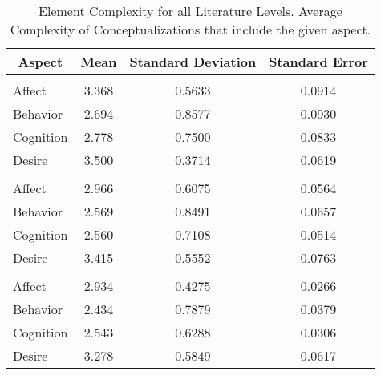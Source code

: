 \begin{table}
\begin{minipage}[t][\textheight][t]{\textwidth}

\caption{\label{tab:CombinedElementComplexity}Element Complexity for all Literature Levels. Average Complexity of Conceptualizations that include the given aspect.}
\begin{tabular}[t]{lccc}
\toprule
\multicolumn{1}{c}{Aspect} & Mean & Standard Deviation & Standard Error\\
\midrule
\addlinespace[0.3em]
\multicolumn{4}{l}{\textbf{Theoretical}}\\
\hspace{1em}Affect & 3.368 & 0.5633 & 0.0914\\
\hspace{1em}Behavior & 2.694 & 0.8577 & 0.0930\\
\hspace{1em}Cognition & 2.778 & 0.7500 & 0.0833\\
\hspace{1em}Desire & 3.500 & 0.3714 & 0.0619\\
\addlinespace[0.3em]
\multicolumn{4}{l}{\textbf{Methdological}}\\
\hspace{1em}Affect & 2.966 & 0.6075 & 0.0564\\
\hspace{1em}Behavior & 2.569 & 0.8491 & 0.0657\\
\hspace{1em}Cognition & 2.560 & 0.7108 & 0.0514\\
\hspace{1em}Desire & 3.415 & 0.5552 & 0.0763\\
\addlinespace[0.3em]
\multicolumn{4}{l}{\textbf{Empirical}}\\
\hspace{1em}Affect & 2.934 & 0.4275 & 0.0266\\
\hspace{1em}Behavior & 2.434 & 0.7879 & 0.0379\\
\hspace{1em}Cognition & 2.543 & 0.6288 & 0.0306\\
\hspace{1em}Desire & 3.278 & 0.5849 & 0.0617\\
\bottomrule
\end{tabular}
\end{minipage}
\end{table}
